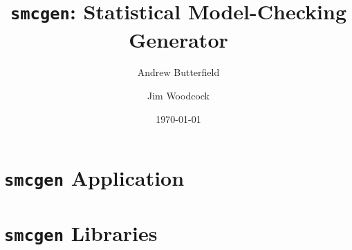 \documentclass[fleqn,10pt]{report}
\author{
Andrew Butterfield \and Jim Woodcock
}
\title{
  \texttt{smcgen}:
  Statistical Model-Checking Generator
}
\date{
\today
}
\begin{document}
\maketitle
\tableofcontents
%
\chapter{\texttt{smcgen} Application}
%

%
\chapter{\texttt{smcgen} Libraries}
%
% 
\newpage

%
%
% 
%
%
%
%
% 
%
% 
%
% 
% 
\end{document}

